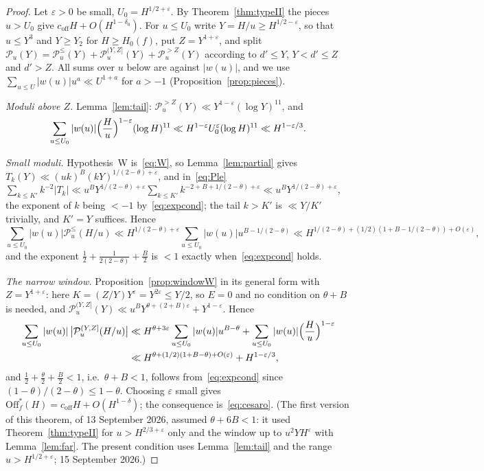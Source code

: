 \documentclass[11pt,a4paper]{article}
\theoremstyle{remark}\newtheorem{remark}[theorem]{Remark}
\newcommand{\Off}{\mathrm{Off}}\newcommand{\e}{\mathrm{e}}
\begin{document}
\begin{proof}
Let $\varepsilon>0$ be small, $U_0=H^{1/2+\varepsilon}$. By Theorem~\ref{thm:typeII} the pieces $u>U_0$ give
$c_{\mathrm{off}}H+O(H^{1-\delta_0})$. For $u\le U_0$ write $Y=H/u\ge H^{1/2-\varepsilon}$, so that $u\le Y^3$ and $Y\ge Y_2$ for $H\ge H_0(f)$, put
$Z=Y^{1+\varepsilon}$, and split $\mathcal P_u(Y)=\mathcal P^\le_u(Y)+\mathcal P^{(Y,Z]}_u(Y)+\mathcal P^{>Z}_u(Y)$ according to $d'\le Y$,
$Y<d'\le Z$ and $d'>Z$. All sums over $u$ below are against $|w(u)|$, and we use $\sum_{u\le U}|w(u)|u^{a}\ll U^{1+a}$ for $a>-1$
(Proposition~\ref{prop:pieces}).

\emph{Moduli above $Z$.} Lemma~\ref{lem:tail}: $\mathcal P^{>Z}_u(Y)\ll Y^{1-\varepsilon}(\log Y)^{11}$, and
\[
\sum_{u\le U_0}|w(u)|\Bigl(\frac Hu\Bigr)^{1-\varepsilon}(\log H)^{11}\ll H^{1-\varepsilon}U_0^{\varepsilon}(\log H)^{11}\ll H^{1-\varepsilon/3}.
\]

\emph{Small moduli.} Hypothesis~W is~\eqref{eq:W}, so Lemma~\ref{lem:partial} gives
$T_k(Y)\ll(uk)^B(kY)^{1/(2-\theta)+\varepsilon}$, and in~\eqref{eq:Ple}
$\sum_{k\le K'}k^{-2}|T_k|\ll u^BY^{1/(2-\theta)+\varepsilon}\sum_{k\le K'}k^{-2+B+1/(2-\theta)+\varepsilon}\ll u^BY^{1/(2-\theta)+\varepsilon}$,
the exponent of $k$ being $<-1$ by~\eqref{eq:expcond}; the tail $k>K'$ is $\ll Y/K'$ trivially, and
$K'=Y$ suffices. Hence
\[
\sum_{u\le U_0}|w(u)|\mathcal P^\le_u(H/u)\ll H^{1/(2-\theta)+\varepsilon}\sum_{u\le U_0}|w(u)|u^{B-1/(2-\theta)}\ll H^{1/(2-\theta)+(1/2)(1+B-1/(2-\theta))+O(\varepsilon)},
\]
and the exponent $\tfrac12+\tfrac1{2(2-\theta)}+\tfrac B2$ is $<1$ exactly when~\eqref{eq:expcond} holds.

\emph{The narrow window.} Proposition~\ref{prop:windowW} in its general form with $Z=Y^{1+\varepsilon}$: here $K=(Z/Y)Y^{\varepsilon}=Y^{2\varepsilon}\le Y/2$, so
$E=0$ and no condition on $\theta+B$ is needed, and $\mathcal P^{(Y,Z]}_u(Y)\ll u^BY^{\theta+(2+B)\varepsilon}+Y^{1-\varepsilon}$. Hence
\[
\begin{aligned}
\sum_{u\le U_0}|w(u)|\,\bigl|\mathcal P^{(Y,Z]}_u(H/u)\bigr|&\ll H^{\theta+3\varepsilon}\sum_{u\le U_0}|w(u)|u^{B-\theta}+\sum_{u\le U_0}|w(u)|\Bigl(\frac Hu\Bigr)^{1-\varepsilon}\\
&\ll H^{\theta+(1/2)(1+B-\theta)+O(\varepsilon)}+H^{1-\varepsilon/3},
\end{aligned}
\]
and $\tfrac12+\tfrac\theta2+\tfrac B2<1$, i.e.\ $\theta+B<1$, follows from~\eqref{eq:expcond} since $(1-\theta)/(2-\theta)\le1-\theta$.
Choosing $\varepsilon$ small gives $\Off^\ast_f(H)=c_{\mathrm{off}}H+O(H^{1-\delta})$; the consequence is~\eqref{eq:cesaro}. (The first version
of this theorem, of 13 September 2026, assumed $\theta+6B<1$: it used Theorem~\ref{thm:typeII} for $u>H^{2/3+\varepsilon}$ only and the window up to
$u^2YH^{\varepsilon}$ with Lemma~\ref{lem:far}. The present condition uses Lemma~\ref{lem:tail} and the range $u>H^{1/2+\varepsilon}$; 15 September 2026.)
\end{proof}
\end{document}
